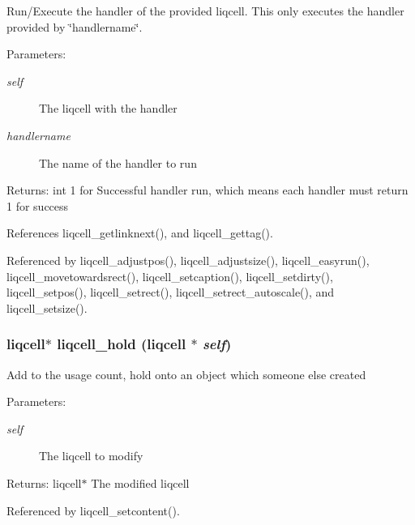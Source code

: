 Run/Execute the handler of the provided liqcell. This only executes the handler provided by \char`\"{}handlername\char`\"{}.

\begin{Desc}
\item[Parameters:]
\begin{description}
\item[{\em self}]The liqcell with the handler \item[{\em handlername}]The name of the handler to run \end{description}
\end{Desc}
\begin{Desc}
\item[Returns:]int 1 for Successful handler run, which means each handler must return 1 for success \end{Desc}


References liqcell\_\-getlinknext(), and liqcell\_\-gettag().

Referenced by liqcell\_\-adjustpos(), liqcell\_\-adjustsize(), liqcell\_\-easyrun(), liqcell\_\-movetowardsrect(), liqcell\_\-setcaption(), liqcell\_\-setdirty(), liqcell\_\-setpos(), liqcell\_\-setrect(), liqcell\_\-setrect\_\-autoscale(), and liqcell\_\-setsize().
\subsubsection[{liqcell\_\-hold}]{\setlength{\rightskip}{0pt plus 5cm}liqcell$\ast$ liqcell\_\-hold (liqcell $\ast$ {\em self})}\label{d5/da2/liqcell_8c_bc3790ff5b66a6dece3e4c237a16b419}


Add to the usage count, hold onto an object which someone else created \begin{Desc}
\item[Parameters:]
\begin{description}
\item[{\em self}]The liqcell to modify \end{description}
\end{Desc}
\begin{Desc}
\item[Returns:]liqcell$\ast$ The modified liqcell \end{Desc}


Referenced by liqcell\_\-setcontent().

